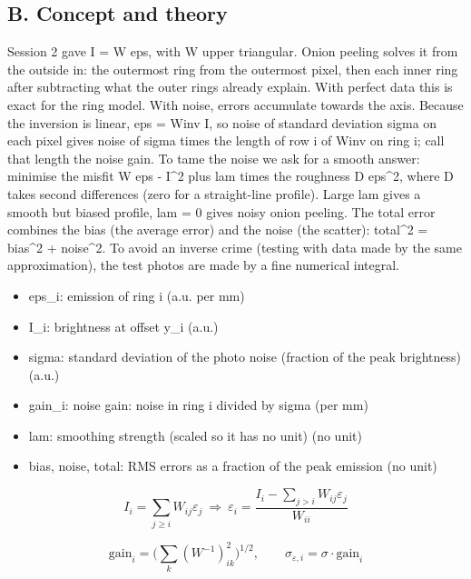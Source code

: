 \documentclass[11pt,a4paper]{article}
\begin{document}
\subsection*{B. Concept and theory}
Session 2 gave I = W eps, with W upper triangular. Onion peeling solves it from the outside in: the outermost ring from the outermost pixel, then each inner ring after subtracting what the outer rings already explain. With perfect data this is exact for the ring model. With noise, errors accumulate towards the axis. Because the inversion is linear, eps = Winv I, so noise of standard deviation sigma on each pixel gives noise of sigma times the length of row i of Winv on ring i; call that length the noise gain. To tame the noise we ask for a smooth answer: minimise the misfit \textbar{}W eps - I\textbar{}\textasciicircum{}2 plus lam times the roughness \textbar{}D eps\textbar{}\textasciicircum{}2, where D takes second differences (zero for a straight-line profile). Large lam gives a smooth but biased profile, lam = 0 gives noisy onion peeling. The total error combines the bias (the average error) and the noise (the scatter): total\textasciicircum{}2 = bias\textasciicircum{}2 + noise\textasciicircum{}2. To avoid an inverse crime (testing with data made by the same approximation), the test photos are made by a fine numerical integral.

\begin{itemize}[nosep]
\item eps\_i: emission of ring i (a.u. per mm)
\item I\_i: brightness at offset y\_i (a.u.)
\item sigma: standard deviation of the photo noise (fraction of the peak brightness) (a.u.)
\item gain\_i: noise gain: noise in ring i divided by sigma (per mm)
\item lam: smoothing strength (scaled so it has no unit) (no unit)
\item bias, noise, total: RMS errors as a fraction of the peak emission (no unit)
\end{itemize}

\begin{equation*}
I_i=\sum_{j\ge i}W_{ij}\varepsilon_j\ \Longrightarrow\ \varepsilon_i=\frac{I_i-\sum_{j>i}W_{ij}\varepsilon_j}{W_{ii}}
\end{equation*}

\begin{equation*}
\mathrm{gain}_i=\Big(\sum_k (W^{-1})_{ik}^2\Big)^{1/2},\qquad \sigma_{\varepsilon,i}=\sigma\cdot\mathrm{gain}_i
\end{equation*}
\end{document}
